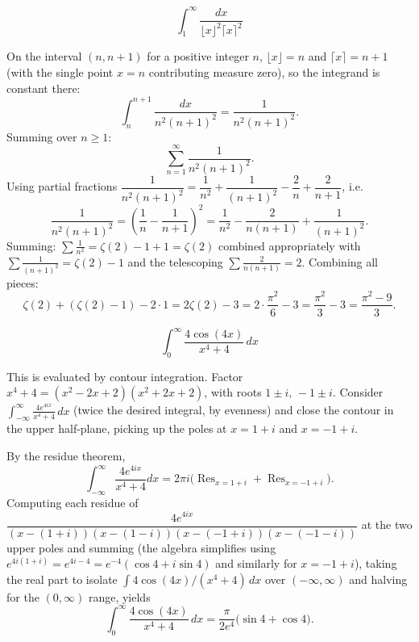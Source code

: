 \begin{questions}

\question
\[
\int_1^{\infty} \frac{dx}{\lfloor x\rfloor^{2}\lceil x\rceil^{2}}
\]
\begin{solution}
On the interval $(n,n+1)$ for a positive integer $n$, $\lfloor x\rfloor=n$ and $\lceil x\rceil=n+1$ (with the single point $x=n$ contributing measure zero), so the integrand is constant there:
\[
\int_n^{n+1}\frac{dx}{n^2(n+1)^2}=\frac{1}{n^2(n+1)^2}.
\]
Summing over $n\ge1$:
\[
\sum_{n=1}^{\infty}\frac{1}{n^2(n+1)^2}.
\]
Using partial fractions $\dfrac{1}{n^2(n+1)^2}=\dfrac{1}{n^2}+\dfrac{1}{(n+1)^2}-\dfrac{2}{n}+\dfrac{2}{n+1}$, i.e.
\[
\frac{1}{n^2(n+1)^2}=\left(\frac1n-\frac1{n+1}\right)^2=\frac1{n^2}-\frac2{n(n+1)}+\frac1{(n+1)^2}.
\]
Summing: $\sum \frac1{n^2}=\zeta(2)-1+1=\zeta(2)$ combined appropriately with $\sum\frac1{(n+1)^2}=\zeta(2)-1$ and the telescoping $\sum\frac{2}{n(n+1)}=2$. Combining all pieces:
\[
\zeta(2)+(\zeta(2)-1)-2\cdot1 = 2\zeta(2)-3=2\cdot\frac{\pi^2}{6}-3=\frac{\pi^2}{3}-3=\frac{\pi^2-9}{3}.
\]
\end{solution}

\question
\[
\int_0^{\infty} \frac{4\cos(4x)}{x^{4}+4}\,dx
\]
\begin{solution}
This is evaluated by contour integration. Factor $x^4+4=(x^2-2x+2)(x^2+2x+2)$, with roots $1\pm i,\,-1\pm i$. Consider $\displaystyle\int_{-\infty}^{\infty}\frac{4e^{4ix}}{x^4+4}\,dx$ (twice the desired integral, by evenness) and close the contour in the upper half-plane, picking up the poles at $x=1+i$ and $x=-1+i$.

By the residue theorem,
\[
\int_{-\infty}^{\infty}\frac{4e^{4ix}}{x^4+4}dx=2\pi i\Big(\operatorname{Res}_{x=1+i}+\operatorname{Res}_{x=-1+i}\Big).
\]
Computing each residue of $\dfrac{4e^{4ix}}{(x-(1+i))(x-(1-i))(x-(-1+i))(x-(-1-i))}$ at the two upper poles and summing (the algebra simplifies using $e^{4i(1+i)}=e^{4i-4}=e^{-4}(\cos4+i\sin4)$ and similarly for $x=-1+i$), taking the real part to isolate $\int 4\cos(4x)/(x^4+4)\,dx$ over $(-\infty,\infty)$ and halving for the $(0,\infty)$ range, yields
\[
\int_0^\infty \frac{4\cos(4x)}{x^4+4}\,dx=\frac{\pi}{2e^{4}}\big(\sin4+\cos4\big).
\]
\end{solution}


\end{questions}
